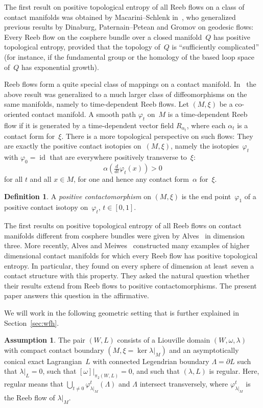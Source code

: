 \documentclass{amsart}
\newcommand{\id}{\textbf{\textit{I}}}
\renewcommand{\id}{\operatorname{id}}
\theoremstyle{definition}
\newtheorem{definition}[proposition]{Definition}
\newtheorem{assumption}[proposition]{Assumption}
\theoremstyle{remark}
\numberwithin{equation}{section}
\begin{document}
The first result on positive topological entropy of all Reeb flows on a class of contact manifolds
was obtained by Macarini--Schlenk in~\cite{MacSch11}, who generalized previous results by Dinaburg, Paternain--Petean 
and Gromov on geodesic flows:
Every Reeb flow on the cosphere bundle over a closed manifold~$Q$ has positive topological
entropy, provided that the topology of~$Q$ is ``sufficiently complicated'' 
(for instance, if the fundamental group or the homology of the based loop space of~$Q$ has exponential growth).

Reeb flows form a quite special class of mappings on a contact manifold. 
In~\cite{D18} the above result was generalized  to a much larger class of diffeomorphisms on the same manifolds,
namely to time-dependent Reeb flows.
%
Let $(M,\xi)$ be a co-oriented contact manifold. 
A smooth path $\varphi_t$ on~$M$ is a time-dependent Reeb flow 
if it is generated by a time-dependent vector field $R_{\alpha_t}$, where each $\alpha_t$
is a contact form for~$\xi$.
There is a more topological perspective on such flows:
They are exactly the positive contact isotopies on~$(M,\xi)$,
namely the isotopies~$\varphi_t$ with $\varphi_0 = \id$ that are everywhere positively transverse to~$\xi$:
$$
\alpha \left( \tfrac{d}{dt} \varphi_t(x) \right) >0
$$ 
for all $t$ and all $x \in M$, 
for one and hence any contact form~$\alpha$ for~$\xi$.

\begin{definition}
{\rm 
A {\it positive contactomorphism}\/ on $(M,\xi)$ is the end point~$\varphi_1$ of a positive contact isotopy on~$\varphi_t$, 
$t \in [0,1]$.
}
\end{definition}

The first results on positive topological entropy of all Reeb flows on contact manifolds different from 
cosphere bundles were given by Alves~\cite{Alv16a,Alv16b,A17} in dimension three.
More recently, Alves and Meiwes~\cite{AM17} constructed many examples of higher dimensional
contact manifolds for which every Reeb flow has positive topological entropy.
In particular, they found on every sphere of dimension at least~seven a contact structure with
this property. 
They asked the natural question whether their results extend from Reeb flows to positive contactomorphisms.
The present paper answers this question in the affirmative.

We will work in the following geometric setting that is further explained in Section~\ref{sec:wfh}.
\begin{assumption}\label{f=0} 
	The pair $(W,L)$ consists of a Liouville domain $(W,\omega,\lambda)$ with compact contact boundary $(M,\xi=\ker\lambda|_M)$ and an asymptotically conical exact Lagrangian~$L$ with connected Legendrian boundary $\Lambda=\partial L$ such that $\lambda|_L=0$, such that $[\omega]|_{\pi_2(W,L)}=0$, and such that $(\lambda,L)$ is regular. Here, regular means that $\bigcup_{t\neq0} \varphi^t_{\lambda|_M}(\Lambda)$ and $\Lambda$ intersect transversely, where $\varphi^t_{\lambda|_M}$ is the Reeb flow of $\lambda|_M$.
\end{assumption}
 
\end{document}
